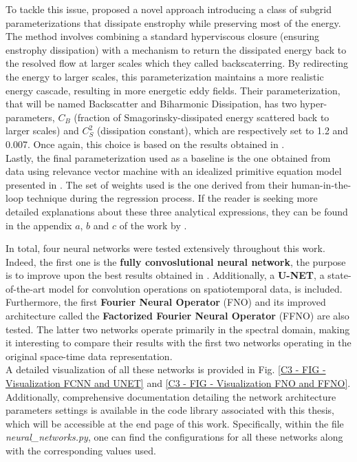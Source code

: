 To tackle this issue, \cite{ClosureAnalytical51, ClosureAnalytical52} proposed a novel approach introducing a class of subgrid parameterizations that dissipate enstrophy while preserving most of the energy. The method involves combining a standard hyperviscous closure (ensuring enstrophy dissipation) with a mechanism to return the dissipated energy back to the resolved flow at larger scales which they called backscaterring. By redirecting the energy to larger scales, this parameterization maintains a more realistic energy cascade, resulting in more energetic eddy fields. Their parameterization, that will be named Backscatter and Biharmonic Dissipation, has two hyper-parameters, $C_B$ (fraction of Smagorinsky-dissipated energy scattered back to larger scales) and $C_S^2$ (dissipation constant), which are respectively set to 1.2 and 0.007. Once again, this choice is based on the results obtained in \cite{Benchmarking}.\\

Lastly, the final parameterization used as a baseline is the one obtained from data using relevance vector machine with an idealized primitive equation model presented in \cite{ClosureDataDrivenZanna}. The set of weights used is the one derived from their human-in-the-loop technique during the regression process. If the reader is seeking more detailed explanations about these three analytical expressions, they can be found in the appendix $a$, $b$ and $c$ of the work by \cite{Benchmarking}.

\vspace{0.4em}

In total, four neural networks were tested extensively throughout this work. Indeed, the first one is the \textbf{fully convoslutional neural network}, the purpose is to improve upon the best results obtained in \cite{Benchmarking}. Additionally, a \textbf{U-NET}, a state-of-the-art model for convolution operations on spatiotemporal data, is included. Furthermore, the first \textbf{Fourier Neural Operator} (FNO) and its improved architecture called the \textbf{Factorized Fourier Neural Operator} (FFNO) are also tested. The latter two networks operate primarily in the spectral domain, making it interesting to compare their results with the first two networks operating in the original space-time data representation.\\

A detailed visualization of all these networks is provided in Fig. \ref{C3 - FIG - Visualization FCNN and UNET} and \ref{C3 - FIG - Visualization FNO and FFNO}. Additionally, comprehensive documentation detailing the network architecture parameters settings is available in the code library associated with this thesis, which will be accessible at the end page of this work. Specifically, within the file \textit{neural\_networks.py}, one can find the configurations for all these networks along with the corresponding values used.\\

